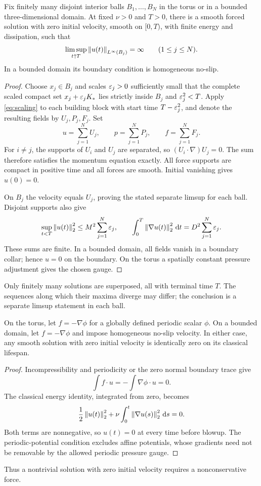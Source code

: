\begin{proposition}\label{prop:multiple}
Fix finitely many disjoint interior balls $B_1,\ldots,B_N$ in the torus or in a bounded three-dimensional domain. At fixed $\nu>0$ and $T>0$, there is a smooth forced solution with zero initial velocity, smooth on $[0,T)$, with finite energy and dissipation, such that
\[
 \limsup_{t\uparrow T}\left\lVert u(t)\right\rVert_{L^\infty(B_j)}=\infty
 \qquad(1\le j\le N).
\]
In a bounded domain its boundary condition is homogeneous no-slip.
\end{proposition}
\begin{proof}
Choose $x_j\in B_j$ and scales $\varepsilon_j>0$ sufficiently small that the complete scaled compact set $x_j+\varepsilon_jK_*$ lies strictly inside $B_j$ and $\varepsilon_j^2<T$. Apply \eqref{eq:scaling} to each building block with start time $T-\varepsilon_j^2$, and denote the resulting fields by $U_j,P_j,F_j$.
Set
\[
 u=\sum_{j=1}^N U_j,\qquad p=\sum_{j=1}^N P_j,\qquad f=\sum_{j=1}^N F_j.
\]
For $i\ne j$, the supports of $U_i$ and $U_j$ are separated, so
$(U_i\cdot\nabla)U_j=0$. The sum therefore satisfies the momentum equation exactly. All force supports are compact in positive time and all forces are smooth. Initial vanishing gives $u(0)=0$.

On $B_j$ the velocity equals $U_j$, proving the stated separate limsup for each ball. Disjoint supports also give
\[
 \sup_{t<T}\left\lVert u(t)\right\rVert_2^2\le M^2\sum_{j=1}^N\varepsilon_j,\qquad
 \int_0^T\left\lVert\nabla u(t)\right\rVert_2^2\,\mathrm d t=D^2\sum_{j=1}^N\varepsilon_j.
\]
These sums are finite. In a bounded domain, all fields vanish in a boundary collar; hence $u=0$ on the boundary. On the torus a spatially constant pressure adjustment gives the chosen gauge.
\end{proof}
Only finitely many solutions are superposed, all with terminal time $T$. The sequences along which their maxima diverge may differ; the conclusion is a separate limsup statement in each ball.

\begin{proposition}\label{prop:conservative}
On the torus, let $f=-\nabla\phi$ for a globally defined periodic scalar
$\phi$. On a bounded domain, let $f=-\nabla\phi$ and impose homogeneous no-slip velocity. In either case, any smooth solution with zero initial velocity is identically zero on its classical lifespan.
\end{proposition}
\begin{proof}
Incompressibility and periodicity or the zero normal boundary trace give
\[
 \int f\cdot u
 =-\int\nabla\phi\cdot u=0.
\]
The classical energy identity, integrated from zero, becomes
\[
 \frac12\left\lVert u(t)\right\rVert_2^2
 +\nu\int_0^t\left\lVert\nabla u(s)\right\rVert_2^2\,\mathrm d s=0.
\]
Both terms are nonnegative, so $u(t)=0$ at every time before blowup.
The periodic-potential condition excludes affine potentials, whose gradients need not be removable by the allowed periodic pressure gauge.
\end{proof}

Thus a nontrivial solution with zero initial velocity requires a nonconservative force.
